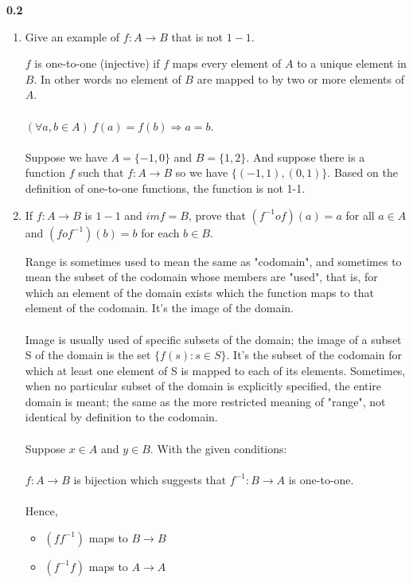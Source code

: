 \documentclass[fleqn]{article}
\begin{document}
  \textbf{0.2}
  \begin{enumerate}
    \item Give an example of $f: A \rightarrow B$ that is not $1-1$.

      \textcolor{hwColor}{
        $f$ is one-to-one (injective) if $f$ maps every element of $A$ to a unique element in $B$. 
        In other words no element of $B$ are mapped to by two or more elements of $A$.
        \\
        \\
        $
          \left( \forall a,b \in A \right) ~ f(a)=f(b) \Rightarrow a=b.
        $
        \\
        \\
        Suppose we have $A=\{-1,0\}$ and $B=\{1, 2\}$. And suppose there is a function $f$
        such that $f: A \rightarrow B$ so we have $\{ (-1,1), (0,1)\}$. Based on the 
        definition of one-to-one functions, the function is not 1-1.
        \\
      }

    \item If $f: A \rightarrow B$ is $1-1$ and $im f=B$, prove that $(f^{-1}of)(a)=a$
    for all $a \in A$ and $(fof^{-1})(b)=b$ for each $b \in B$.

      \textcolor{hwColor}{
        Range is sometimes used to mean the same as "codomain", and sometimes to mean the subset of the codomain whose members are "used", 
        that is, for which an element of the domain exists which the function maps to that element of the codomain. It’s the image of the domain.
        \\
        \\
        Image is usually used of specific subsets of the domain; the image of a subset  S  of the domain is the set $\{f(s): s \in S \}$. 
        It’s the subset of the codomain for which at least one element of  S  is mapped to each of its elements. Sometimes, 
        when no particular subset of the domain is explicitly specified, the entire domain is meant; the same as the more 
        restricted meaning of "range", not identical by definition to the codomain.
        \\
        \\
        Suppose $x \in A$ and $y \in B$. With the given conditions:
        \\
        \\
        $f: A \rightarrow B$ is bijection which suggests that $f^{-1}: B \rightarrow A$ is one-to-one. 
        \\
        \\
        Hence, \begin{itemize}
          \item $\left(f f^{-1}\right)$ maps to $B \rightarrow B$
          \item $\left(f^{-1} f\right)$ maps to $A \rightarrow A$
        \end{itemize}
      }


\end{enumerate}
\end{document}
